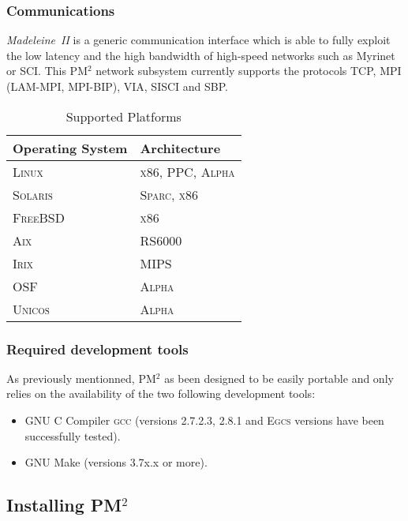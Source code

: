 \documentclass[a4paper,11pt]{report}
\def\pm2{PM$^2$\xspace}
\def\madii{\emph{Madeleine~II}\xspace}
\begin{document}
\subsubsection{Communications}
\madii is a generic communication interface which is able to fully
exploit the low latency and the high bandwidth of high-speed networks
such as Myrinet or SCI. This \pm2 network subsystem currently supports
the protocols TCP, MPI (LAM-MPI, MPI-BIP), VIA, SISCI and SBP.
\begin{table}
\caption{Supported Platforms\label{tbl:platforms}}
\begin{center}
\begin{tabular}[p]{|l|l|}                                        \hline
Operating System & Architecture                               \\ \hline
\textsc{Linux}   & \textsc{x86}, \textsc{PPC}, \textsc{Alpha} \\
\textsc{Solaris} & \textsc{Sparc}, \textsc{x86}               \\
\textsc{FreeBSD} & \textsc{x86}                               \\
\textsc{Aix}     & \textsc{RS6000}                            \\
\textsc{Irix}    & \textsc{MIPS}                              \\
\textsc{OSF}     & \textsc{Alpha}                             \\
\textsc{Unicos}  & \textsc{Alpha}                             \\ \hline
\end{tabular}
\end{center}
\end{table}
\subsubsection{Required development tools}
As previously mentionned, \pm2 as been designed to be easily portable
and only relies on the availability of the two following development tools:
\begin{itemize}
\small
\item GNU C Compiler \textsc{gcc} (versions 2.7.2.3, 2.8.1 and \textsc{Egcs}
versions have been successfully tested).
\item GNU Make (versions 3.7x.x or more).
\end{itemize}
 

\subsection{Installing \pm2}
\end{document}
